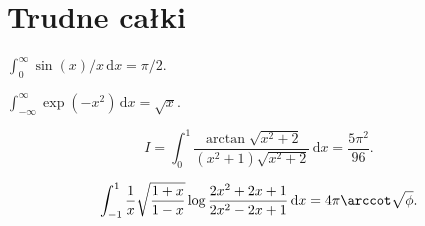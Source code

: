 \section{Trudne całki}

\begin{integral}
    $\int_0^\infty \sin(x) / x \,\mathrm{d}x = \pi/2$.
\end{integral}

\begin{integral}
    $\int_{-\infty}^\infty \exp(-x^2) \,\mathrm{d}x = \sqrt x$.
\end{integral}

\begin{integral}
    \begin{equation}
        I = \int_0^1 \frac{\arctan \sqrt{x^2+2}}{(x^2+1) \sqrt{x^2+2}} \,\mathrm{d}x = \frac{5\pi^2}{96}.
    \end{equation}
\end{integral}

\begin{integral}
    \begin{equation}
        \int_{-1}^1 \frac{1}{x} \sqrt{\frac{1+x}{1-x}} \log \frac{2x^2+2x+1}{2x^2-2x+1} \,\mathrm{d}x = 4 \pi \arccot \sqrt{\phi}.
    \end{equation}
\end{integral}



